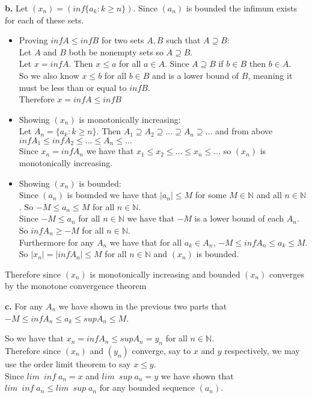 \documentclass{article}
\begin{document}
{\Large \textbf{b.}} Let $(x_n) = (inf\{a_k : k\geq n\})$. Since $(a_n)$ is bounded the infimum exists for each of these sets.
\begin{center}
    \doublespacing
    \begin{itemize}
        \item Proving $inf A\leq inf B$ for two sets $A, B$ such that $A\supseteq B$:
        \\Let $A$ and $B$ both be nonempty sets so $A\supseteq B$.
        \\Let $x = inf A$. Then $x\leq a$ for all $a\in A$. Since $A\supseteq B$ if $b\in B$ then $b\in A$.
        \\So we also know $x\leq b$ for all $b\in B$ and is a lower bound of $B$, meaning it must be less than or equal to $inf B$.
        \\Therefore $x = inf A\leq inf B$
        \item Showing $(x_n)$ is monotonically increasing:
        \\Let $A_n = \{a_k : k\geq n\}$. Then $A_1\supseteq A_2\supseteq ...\supseteq A_n\supseteq ...$ and from above $inf A_1\leq inf A_2\leq ...\leq A_n\leq ...$
        \\Since $x_n = inf A_n$ we have that $x_1\leq x_2\leq ...\leq x_n\leq ...$ so $(x_n)$ is monotonically increasing.
        \item Showing $(x_n)$ is bounded:
        \\Since $(a_n)$ is bounded we have that $|a_n|\leq M$ for some $M\in\mathbb{N}$ and all $n\in\mathbb{N}$. So $-M\leq a_n\leq M$ for all $n\in\mathbb{N}$.
        \\Since $-M\leq a_n$ for all $n\in\mathbb{N}$ we have that $-M$ is a lower bound of each $A_n$. So $inf A_n\geq -M$ for all $n\in\mathbb{N}$.
        \\Furthermore for any $A_n$ we have that for all $a_k\in A_n$, $-M\leq inf A_n\leq a_k\leq M$.
        \\So $|x_n| = |inf A_n|\leq M$ for all $n\in\mathbb{N}$ and $(x_n)$ is bounded.
    \end{itemize}
    Therefore since $(x_n)$ is monotonically increasing and bounded $(x_n)$ converges by the monotone convergence theorem \qedsymbol
\end{center}

{\Large \textbf{c.}} For any $A_n$ we have shown in the previous two parts that $-M\leq inf A_n\leq a_k\leq sup A_n\leq M$.
\begin{center}
    \doublespacing
    So we have that $x_n = inf A_n\leq sup A_n = y_n$ for all $n\in\mathbb{N}$.
    \\Therefore since $(x_n)$ and $(y_n)$ converge, say to $x$ and $y$ respectively, we may use the order limit theorem to say $x\leq y$.
    \\Since $lim\;\: inf\;a_n = x$ and $lim\;\: sup\;a_n = y$ we have shown that $lim\;\: inf\;a_n\leq lim\;\: sup\;a_n$ for any bounded sequence $(a_n)$.
\end{center}
\end{document}
